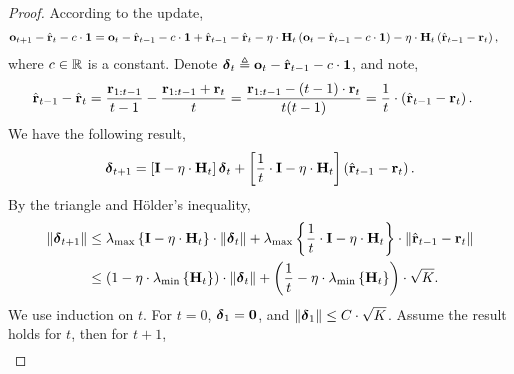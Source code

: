 \documentclass[10pt]{article}
\begin{document}
\begin{proof}
According to the update,
\begin{equation*}
\begin{split}
    {\mathbf{o}}_{t+1} - \hat{{\mathbf{r}}}_t - c \cdot {\mathbf{1}} &= {\mathbf{o}}_{t} - \hat{{\mathbf{r}}}_{t-1} - c \cdot {\mathbf{1}} + \hat{{\mathbf{r}}}_{t-1} - \hat{{\mathbf{r}}}_t - \eta \cdot {\mathbf{H}}_t \left( {\mathbf{o}}_{t} - \hat{{\mathbf{r}}}_{t-1} - c \cdot {\mathbf{1}} \right) - \eta \cdot {\mathbf{H}}_t \left( \hat{{\mathbf{r}}}_{t-1} - {\mathbf{r}}_t \right),
\end{split}
\end{equation*}
where $c \in {\mathbb{R}}$ is a constant. Denote ${\boldsymbol{\delta}}_{t} \triangleq {\mathbf{o}}_{t} - \hat{{\mathbf{r}}}_{t-1} - c \cdot {\mathbf{1}}$, and note,
\begin{equation*}
\begin{split}
    \hat{{\mathbf{r}}}_{t-1} - \hat{{\mathbf{r}}}_t &= \frac{{\mathbf{r}}_{1:t-1}}{t-1} - \frac{{\mathbf{r}}_{1:t-1} + {\mathbf{r}}_t}{t} = \frac{{\mathbf{r}}_{1:t-1} - (t-1) \cdot {\mathbf{r}}_t }{t(t-1)} = \frac{1}{t} \cdot \left( \hat{{\mathbf{r}}}_{t-1} - {\mathbf{r}}_t \right).
\end{split}
\end{equation*}
We have the following result,
\begin{equation*}
\begin{split}
    {\boldsymbol{\delta}}_{t+1} = \left[ {\mathbf{I}} - \eta \cdot {\mathbf{H}}_t \right] {\boldsymbol{\delta}}_t + \left[ \frac{1}{t} \cdot {\mathbf{I}} - \eta \cdot {\mathbf{H}}_t \right] \left( \hat{{\mathbf{r}}}_{t-1} - {\mathbf{r}}_t \right).
\end{split}
\end{equation*}
By the triangle and H{\" o}lder's inequality,
\begin{equation*}
\begin{split}
    \left\| {\boldsymbol{\delta}}_{t+1} \right\| &\le \lambda_{\max}\left\{ {\mathbf{I}} - \eta \cdot {\mathbf{H}}_t \right\} \cdot \left\| {\boldsymbol{\delta}}_{t} \right\| + \lambda_{\max}\left\{ \frac{1}{t} \cdot {\mathbf{I}} - \eta \cdot {\mathbf{H}}_t \right\} \cdot \left\| \hat{{\mathbf{r}}}_{t-1} - {\mathbf{r}}_t \right\| \\
    &\le \left( 1 - \eta \cdot \lambda_{\min}\left\{ {\mathbf{H}}_t \right\} \right) \cdot \left\| {\boldsymbol{\delta}}_{t} \right\| + \left( \frac{1}{t} - \eta \cdot \lambda_{\min}\left\{ {\mathbf{H}}_t \right\} \right) \cdot \sqrt{K}.
\end{split}
\end{equation*}
We use induction on $t$. For $t = 0$, ${\boldsymbol{\delta}}_{1} = {\mathbf{0}}$, and $\left\| {\boldsymbol{\delta}}_{1} \right\| \le C \cdot \sqrt{K}$. Assume the result holds for $t$, then for $t+1$,
\begin{equation*}
\begin{split}

\end{split}
\end{equation*}
\end{proof}
\end{document}
